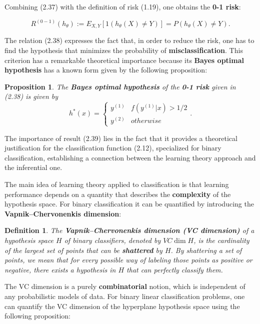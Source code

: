 \documentclass{report}
\newtheorem{definition}{Definition}[chapter]
\newtheorem{proposition}{Proposition}[chapter]
\begin{document}
Combining (2.37) with the definition of risk (1.19), one obtains the \textbf{0-1 risk}:

\begin{equation}
R^{(0-1)}(h_\theta) := E_{X,Y}[1(h_\theta(X) \neq Y)] = P(h_\theta(X) \neq Y).
\end{equation}

The relation (2.38) expresses the fact that, in order to reduce the risk, one has to find the hypothesis that minimizes the probability of \textbf{misclassification}. This criterion has a remarkable theoretical importance because its \textbf{Bayes optimal hypothesis} has a known form given by the following proposition:

\begin{proposition}
The \textbf{Bayes optimal hypothesis} of the \textbf{0-1 risk} given in (2.38) is given by
\begin{equation}
 h^*(x) = \left\{\begin{matrix}
y^{(1)} & f(y^{(1)}|x) > 1/2\\
y^{(2)} & otherwise
\end{matrix}\right..   
\end{equation}
\end{proposition}

The importance of result (2.39) lies in the fact that it provides a theoretical justification for the classification function (2.12), specialized for binary classification, establishing a connection between the learning theory approach and the inferential one.

The main idea of learning theory applied to classification is that learning performance depends on a quantity that describes the \textbf{complexity} of the hypothesis space.
For binary classification it can be quantified by introducing the \textbf{Vapnik–Chervonenkis dimension}:

\begin{definition}
The \textbf{Vapnik–Chervonenkis dimension (VC dimension)} of a hypothesis space $H$ of binary classifiers, denoted by $VC\dim H$, is the cardinality of the largest set of points that can be \textbf{shattered} by $H$. By shattering a set of points, we mean that for every possible way of labeling those points as positive or negative, there exists a hypothesis in $H$ that can perfectly classify them.
\end{definition}

The VC dimension is a purely \textbf{combinatorial} notion, which is independent of any probabilistic models of data. For binary linear classification problems, one can quantify the VC dimension of the hyperplane hypothesis space using the following proposition:
\end{document}
